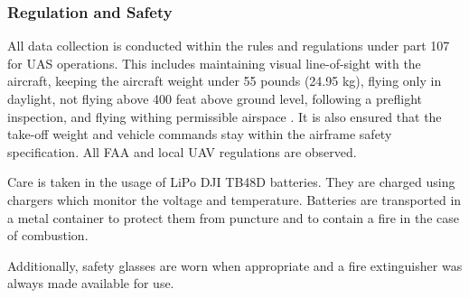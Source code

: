 \documentclass[fleqn,10pt]{wlscirep}
\begin{document}
\subsubsection*{Regulation and Safety}
All data collection is conducted within the rules and regulations under part 107 for UAS operations. This includes maintaining visual line-of-sight with the aircraft, keeping the aircraft weight under 55 pounds (24.95 kg), flying only in daylight, not flying above 400 feat above ground level, following a preflight inspection, and flying withing permissible airspace \cite{part107}. It is also ensured that the take-off weight and vehicle commands stay within the airframe safety specification. All FAA and local UAV regulations are observed.

Care is taken in the usage of LiPo DJI TB48D batteries. They are charged using chargers which monitor the voltage and temperature. Batteries are transported in a metal container to protect them from puncture and to contain a fire in the case of combustion. 

Additionally, safety glasses are worn when appropriate and a fire extinguisher was always made available for use.
\end{document}

